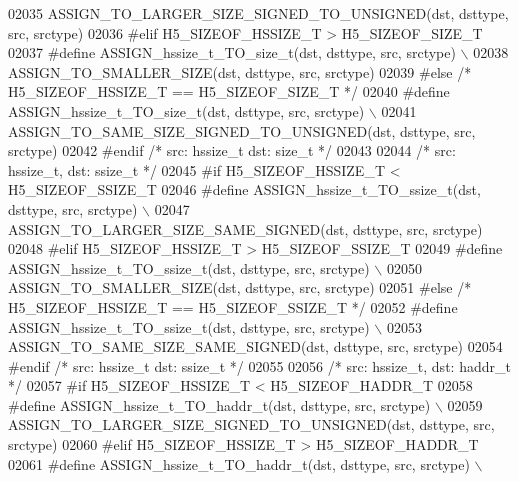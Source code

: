\begin{DoxyCode}
02035 \textcolor{preprocessor}{        ASSIGN\_TO\_LARGER\_SIZE\_SIGNED\_TO\_UNSIGNED(dst, dsttype, src, srctype)}
02036 \textcolor{preprocessor}{#elif H5\_SIZEOF\_HSSIZE\_T > H5\_SIZEOF\_SIZE\_T}
02037 \textcolor{preprocessor}{    #define ASSIGN\_hssize\_t\_TO\_size\_t(dst, dsttype, src, srctype) \(\backslash\)}
02038 \textcolor{preprocessor}{        ASSIGN\_TO\_SMALLER\_SIZE(dst, dsttype, src, srctype)}
02039 \textcolor{preprocessor}{#else }\textcolor{comment}{/* H5\_SIZEOF\_HSSIZE\_T == H5\_SIZEOF\_SIZE\_T */}\textcolor{preprocessor}{}
02040 \textcolor{preprocessor}{    #define ASSIGN\_hssize\_t\_TO\_size\_t(dst, dsttype, src, srctype) \(\backslash\)}
02041 \textcolor{preprocessor}{        ASSIGN\_TO\_SAME\_SIZE\_SIGNED\_TO\_UNSIGNED(dst, dsttype, src, srctype)}
02042 \textcolor{preprocessor}{#endif }\textcolor{comment}{/* src: hssize\_t dst: size\_t */}\textcolor{preprocessor}{}
02043 
02044 \textcolor{comment}{/* src: hssize\_t, dst: ssize\_t */}
02045 \textcolor{preprocessor}{#if H5\_SIZEOF\_HSSIZE\_T < H5\_SIZEOF\_SSIZE\_T}
02046 \textcolor{preprocessor}{    #define ASSIGN\_hssize\_t\_TO\_ssize\_t(dst, dsttype, src, srctype) \(\backslash\)}
02047 \textcolor{preprocessor}{        ASSIGN\_TO\_LARGER\_SIZE\_SAME\_SIGNED(dst, dsttype, src, srctype)}
02048 \textcolor{preprocessor}{#elif H5\_SIZEOF\_HSSIZE\_T > H5\_SIZEOF\_SSIZE\_T}
02049 \textcolor{preprocessor}{    #define ASSIGN\_hssize\_t\_TO\_ssize\_t(dst, dsttype, src, srctype) \(\backslash\)}
02050 \textcolor{preprocessor}{        ASSIGN\_TO\_SMALLER\_SIZE(dst, dsttype, src, srctype)}
02051 \textcolor{preprocessor}{#else }\textcolor{comment}{/* H5\_SIZEOF\_HSSIZE\_T == H5\_SIZEOF\_SSIZE\_T */}\textcolor{preprocessor}{}
02052 \textcolor{preprocessor}{    #define ASSIGN\_hssize\_t\_TO\_ssize\_t(dst, dsttype, src, srctype) \(\backslash\)}
02053 \textcolor{preprocessor}{        ASSIGN\_TO\_SAME\_SIZE\_SAME\_SIGNED(dst, dsttype, src, srctype)}
02054 \textcolor{preprocessor}{#endif }\textcolor{comment}{/* src: hssize\_t dst: ssize\_t */}\textcolor{preprocessor}{}
02055 
02056 \textcolor{comment}{/* src: hssize\_t, dst: haddr\_t */}
02057 \textcolor{preprocessor}{#if H5\_SIZEOF\_HSSIZE\_T < H5\_SIZEOF\_HADDR\_T}
02058 \textcolor{preprocessor}{    #define ASSIGN\_hssize\_t\_TO\_haddr\_t(dst, dsttype, src, srctype) \(\backslash\)}
02059 \textcolor{preprocessor}{        ASSIGN\_TO\_LARGER\_SIZE\_SIGNED\_TO\_UNSIGNED(dst, dsttype, src, srctype)}
02060 \textcolor{preprocessor}{#elif H5\_SIZEOF\_HSSIZE\_T > H5\_SIZEOF\_HADDR\_T}
02061 \textcolor{preprocessor}{    #define ASSIGN\_hssize\_t\_TO\_haddr\_t(dst, dsttype, src, srctype) \(\backslash\)}

\end{DoxyCode}
